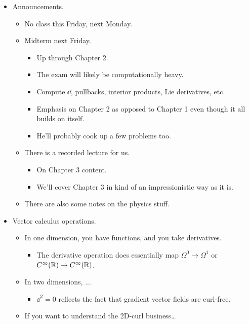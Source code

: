 \documentclass[../notes.tex]{subfiles}
\begin{document}
\begin{itemize}
    \item {}Announcements.
    \begin{itemize}
        \item No class this Friday, next Monday.
        \item Midterm next Friday.
        \begin{itemize}
            \item Up through Chapter 2.
            \item The exam will likely be computationally heavy.
            \item Compute $\dd$, pullbacks, interior products, Lie derivatives, etc.
            \item Emphasis on Chapter 2 as opposed to Chapter 1 even though it all builds on itself.
            \item He'll probably cook up a few problems too.
        \end{itemize}
        \item There is a recorded lecture for us.
        \begin{itemize}
            \item On Chapter 3 content.
            \item We'll cover Chapter 3 in kind of an impressionistic way as it is.
        \end{itemize}
        \item There are also some notes on the physics stuff.
    \end{itemize}
    \item Vector calculus operations.
    \begin{itemize}
        \item In one dimension, you have functions, and you take derivatives.
        \begin{itemize}
            \item The derivative operation does essentially map $\Omega^0\to\Omega^1$ or $C^\infty(\mathbb{R})\to C^\infty(\mathbb{R})$.
        \end{itemize}
        \item In two dimensions, ...
        \begin{itemize}
            \item $\dd^2=0$ reflects the fact that gradient vector fields are curl-free.
        \end{itemize}
        \item If you want to understand the 2D-curl business\dots

\end{itemize}
\end{itemize}
\end{document}
